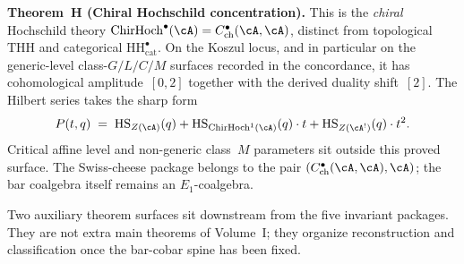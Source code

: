 \noindent\textbf{Theorem~H (Chiral Hochschild concentration).}\enspace
This is the \emph{chiral} Hochschild theory
$\ChirHoch^\bullet(\cA)=C^\bullet_{\mathrm{ch}}(\cA,\cA)$, distinct
from topological $\mathrm{THH}$ and categorical
$\mathrm{HH}_{\mathrm{cat}}^\bullet$. On the Koszul locus, and in
particular on the generic-level class-$G/L/C/M$ surfaces recorded in
the concordance, it has cohomological amplitude~$[0,2]$ together with
the derived duality shift~$[2]$. The Hilbert series
takes the sharp form
\[
 P(t,q) \;=\;
 \mathrm{HS}_{Z(\cA)}(q) + \mathrm{HS}_{\ChirHoch^1(\cA)}(q)\cdot t
 + \mathrm{HS}_{Z(\cA^{!})}(q)\cdot t^2.
\]
Critical affine level and non-generic class~$M$ parameters sit outside
this proved surface. The Swiss-cheese package belongs to the pair
$(C^\bullet_{\mathrm{ch}}(\cA,\cA),\cA)$; the bar coalgebra itself
remains an $E_1$-coalgebra.

\medskip

Two auxiliary theorem surfaces sit downstream from the five invariant
packages. They are not extra main theorems of Volume~I; they organize
reconstruction and classification once the bar-cobar spine has been
fixed.

\medskip

